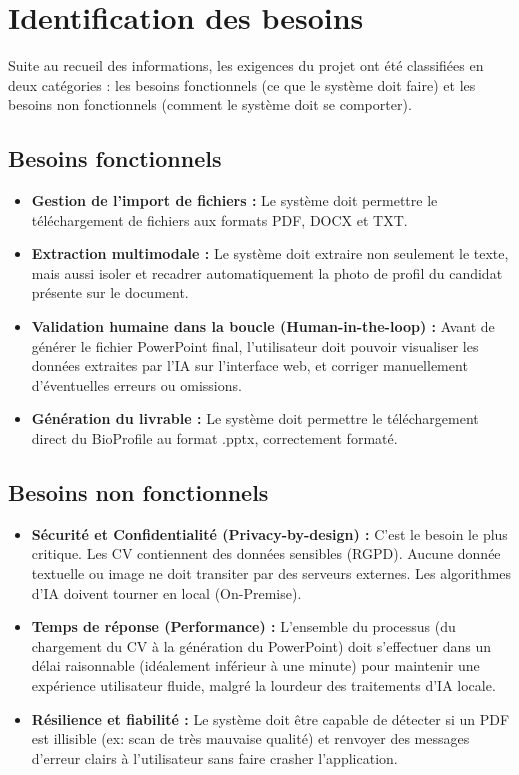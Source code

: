 \section{Identification des besoins}

Suite au recueil des informations, les exigences du projet ont été classifiées en deux catégories : les besoins fonctionnels (ce que le système doit faire) et les besoins non fonctionnels (comment le système doit se comporter).

\subsection{Besoins fonctionnels}
\begin{itemize}
    \item \textbf{Gestion de l'import de fichiers :} Le système doit permettre le téléchargement de fichiers aux formats PDF, DOCX et TXT.
    \item \textbf{Extraction multimodale :} Le système doit extraire non seulement le texte, mais aussi isoler et recadrer automatiquement la photo de profil du candidat présente sur le document.
    \item \textbf{Validation humaine dans la boucle (Human-in-the-loop) :} Avant de générer le fichier PowerPoint final, l'utilisateur doit pouvoir visualiser les données extraites par l'IA sur l'interface web, et corriger manuellement d'éventuelles erreurs ou omissions.
    \item \textbf{Génération du livrable :} Le système doit permettre le téléchargement direct du BioProfile au format .pptx, correctement formaté.
\end{itemize}

\subsection{Besoins non fonctionnels}
\begin{itemize}
    \item \textbf{Sécurité et Confidentialité (Privacy-by-design) :} C'est le besoin le plus critique. Les CV contiennent des données sensibles (RGPD). Aucune donnée textuelle ou image ne doit transiter par des serveurs externes. Les algorithmes d'IA doivent tourner en local (On-Premise).
    \item \textbf{Temps de réponse (Performance) :} L'ensemble du processus (du chargement du CV à la génération du PowerPoint) doit s'effectuer dans un délai raisonnable (idéalement inférieur à une minute) pour maintenir une expérience utilisateur fluide, malgré la lourdeur des traitements d'IA locale.
    \item \textbf{Résilience et fiabilité :} Le système doit être capable de détecter si un PDF est illisible (ex: scan de très mauvaise qualité) et renvoyer des messages d'erreur clairs à l'utilisateur sans faire crasher l'application.
\end{itemize}


